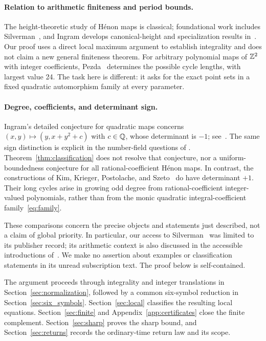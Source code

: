 \paragraph{Relation to arithmetic finiteness and period bounds.}
The height-theoretic study of H\'enon maps is classical; foundational
work includes Silverman~\cite{silverman1994geometric}, and Ingram
develops canonical-height and specialization results
in~\cite{ingram2014canonical}. Our proof uses a direct local maximum
argument to establish integrality and does not claim a new general
finiteness theorem. For arbitrary polynomial maps of \(\mathbb{Z}^2\) with
integer coefficients, Pezda~\cite[Theorem 2.1]{pezda2002cycles}
determines the possible cycle lengths, with largest value 24. The task
here is different: it asks for the exact point sets in a fixed quadratic
automorphism family at every parameter.

\paragraph{Degree, coefficients, and determinant sign.}
Ingram's detailed conjecture for quadratic maps concerns
\((x,y)\mapsto(y,x+y^2+c)\) with \(c\in\mathbb{Q}\), whose determinant is
\(-1\); see~\cite{ingram2014canonical}. The same sign distinction is
explicit in the number-field questions of
\cite[Section 11]{dehenon2024problems}. Theorem~\ref{thm:classification}
does not resolve that conjecture, nor a uniform-boundedness conjecture
for all rational-coefficient H\'enon maps. In contrast, the constructions
of Kim, Krieger, Postolache, and Szeto~\cite{kim2025many} do have
determinant \(+1\). Their long cycles arise in growing odd degree from
rational-coefficient integer-valued polynomials, rather than from the
monic quadratic integral-coefficient family~\eqref{eq:family}.

These comparisons concern the precise objects and statements just
described, not a claim of global priority. In particular, our access to
Silverman~\cite{silverman1994geometric} was limited to its publisher
record; its arithmetic context is also discussed in the accessible
introductions of~\cite{ingram2014canonical,kim2025many}. We make no
assertion about examples or classification statements in its unread
subscription text. The proof below is self-contained.

The argument proceeds through integrality and integer translations in
Section~\ref{sec:normalization}, followed by a common six-symbol
reduction in Section~\ref{sec:six_symbols}. Section~\ref{sec:local}
classifies the resulting local equations. Section~\ref{sec:finite}
and Appendix~\ref{app:certificates} close the finite complement.
Section~\ref{sec:sharp} proves the sharp bound, and
Section~\ref{sec:returns} records the ordinary-time return law and its
scope.
